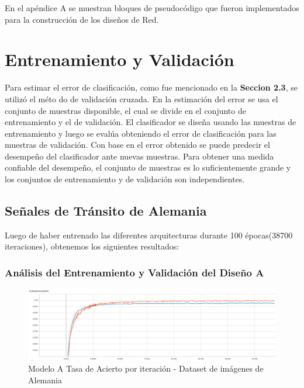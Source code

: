 			En el apéndice A se muestran bloques de pseudocódigo que fueron implementados para la construcción de los diseños de Red.
\section{Entrenamiento y Validación }

	Para estimar el error de clasificación, como fue mencionado en la \textbf{Seccion 2.3}, se utilizó el méto do de validación cruzada. En la estimación del error se usa el conjunto de muestras disponible, el cual se divide en el conjunto de entrenamiento y el de validación. El clasificador se diseña usando las muestras de entrenamiento y luego se evalúa obteniendo el error de clasificación para las muestras de validación. Con base en el error obtenido se puede predecir el desempeño del clasificador ante nuevas muestras. Para obtener una medida confiable del desempeño, el conjunto de muestras es lo suficientemente grande y los conjuntos de entrenamiento y de validación son independientes.


	\subsection{Señales de Tránsito de Alemania}

		Luego de haber entrenado las diferentes arquitecturas durante 100 épocas(38700 iteraciones), obtenemos los siguientes resultados:
	 	\subsubsection{Análisis del Entrenamiento y Validación del Diseño A}  
			\begin{figure}[H]
				\begin{center}
				\includegraphics[width=1\textwidth]{images/desarrollo/trainResults/german/model0Acierto} 
				\end{center}
				\begin{center}
				\caption{\small{Modelo A Tasa de Acierto por iteración - Dataset de imágenes de Alemania  }}
				
				{\small{\fontsize{10}{16.8}\selectfont {Fuente: Elaboración propia}}}
				\end{center}
				\vspace{-1.5em}
			\end{figure}

